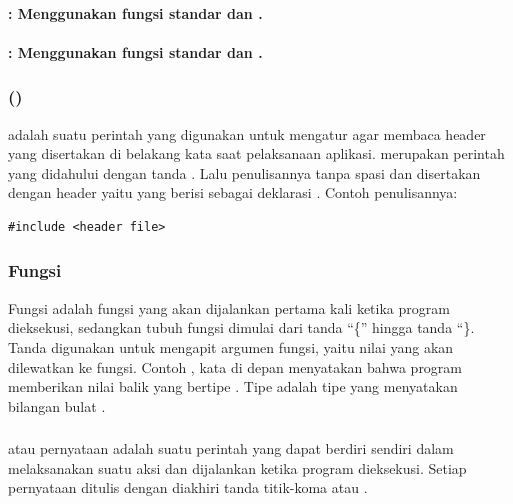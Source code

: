 \documentclass[../main.tex]{subfiles}
\begin{document}
    \paragraph{	: Menggunakan fungsi standar {\ioi} dan {\ioo}.}
    \paragraph{	: Menggunakan fungsi standar {\ioi} dan {\ioo} {\stream}.}

    \subsubsection{{\Preprocessor} {\Directive} ()}
    \begin{indentlevel0}
        {\Preprocessor} {\directive} adalah suatu perintah yang digunakan untuk mengatur {\compiler} agar membaca header {\file} yang disertakan di belakang kata  saat pelaksanaan aplikasi. {\Preprocessor} {\directive} merupakan perintah yang didahului dengan tanda . Lalu penulisannya tanpa spasi dan disertakan dengan header {\file} yaitu {\file} yang berisi sebagai {\file} deklarasi \parencite{kadir2005heriyanto}. Contoh penulisannya:
        \begin{lstlisting}
#include <header file>
\end{lstlisting}
    \end{indentlevel0}

    \subsubsection{Fungsi }
    \begin{indentlevel0}
        Fungsi  adalah fungsi yang akan dijalankan pertama kali ketika program dieksekusi, sedangkan tubuh fungsi dimulai dari tanda “\{” hingga tanda “\}. Tanda  digunakan untuk mengapit argumen fungsi, yaitu nilai yang akan dilewatkan ke fungsi. Contoh , kata  di depan  menyatakan bahwa program memberikan nilai balik yang bertipe . Tipe  adalah tipe yang menyatakan bilangan bulat \parencite{kadir2005heriyanto}.
    \end{indentlevel0}

    \subsubsection{{\Statement}}
    \begin{indentlevel0}
        {\Statement} atau pernyataan adalah suatu perintah yang dapat berdiri sendiri dalam melaksanakan suatu aksi dan dijalankan ketika program dieksekusi. Setiap pernyataan ditulis dengan diakhiri tanda titik-koma atau {\semicolon}  \parencite{friyadi2005panduan}.
    \end{indentlevel0}
\end{document}
